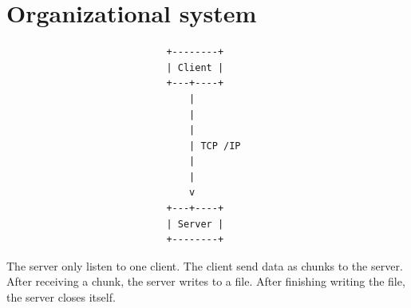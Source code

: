 \documentclass[12pt]{article}
\begin{document}
\newpage
\section{Organizational system }
\vspace{1cm}
\begin{verbatim}
                            +--------+
                            | Client |
                            +---+----+
                                |
                                |
                                |
                                | TCP /IP
                                |
                                |
                                v
                            +---+----+
                            | Server |
                            +--------+
\end{verbatim}
\vspace{0.5cm}
\begin{flushleft}
 The server only listen to one client. The client send data as chunks to the server. After receiving a chunk, the server writes to a file. After finishing writing the file, the server closes itself.
\end{flushleft}
\vspace{0.1cm}
\end{document}
